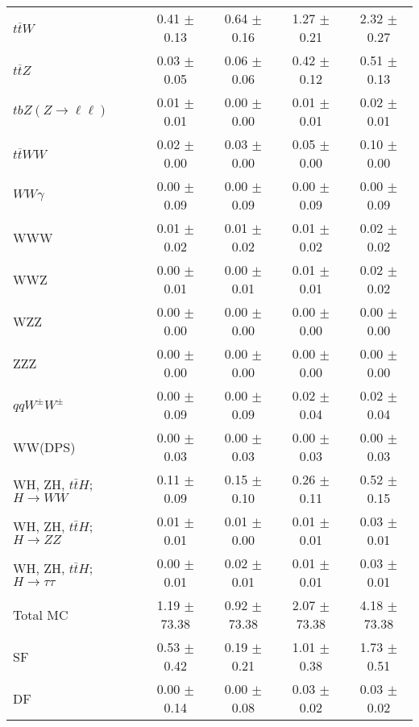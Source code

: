 \begin{tabular}{l|cccc}
                   $t\overline{t}W$ &  0.41 $\pm$  0.13 &  0.64 $\pm$  0.16 &  1.27 $\pm$  0.21 &  2.32 $\pm$  0.27 \\
                   $t\overline{t}Z$ &  0.03 $\pm$  0.05 &  0.06 $\pm$  0.06 &  0.42 $\pm$  0.12 &  0.51 $\pm$  0.13 \\
    $tbZ (Z \rightarrow \ell \ell)$ &  0.01 $\pm$  0.01 &  0.00 $\pm$  0.00 &  0.01 $\pm$  0.01 &  0.02 $\pm$  0.01 \\
                  $t\overline{t}WW$ &  0.02 $\pm$  0.00 &  0.03 $\pm$  0.00 &  0.05 $\pm$  0.00 &  0.10 $\pm$  0.00 \\
                         $WW\gamma$ &  0.00 $\pm$  0.09 &  0.00 $\pm$  0.09 &  0.00 $\pm$  0.09 &  0.00 $\pm$  0.09 \\
                                WWW &  0.01 $\pm$  0.02 &  0.01 $\pm$  0.02 &  0.01 $\pm$  0.02 &  0.02 $\pm$  0.02 \\
                                WWZ &  0.00 $\pm$  0.01 &  0.00 $\pm$  0.01 &  0.01 $\pm$  0.01 &  0.02 $\pm$  0.02 \\
                                WZZ &  0.00 $\pm$  0.00 &  0.00 $\pm$  0.00 &  0.00 $\pm$  0.00 &  0.00 $\pm$  0.00 \\
                                ZZZ &  0.00 $\pm$  0.00 &  0.00 $\pm$  0.00 &  0.00 $\pm$  0.00 &  0.00 $\pm$  0.00 \\
                 $qqW^{\pm}W^{\pm}$ &  0.00 $\pm$  0.09 &  0.00 $\pm$  0.09 &  0.02 $\pm$  0.04 &  0.02 $\pm$  0.04 \\
                            WW(DPS) &  0.00 $\pm$  0.03 &  0.00 $\pm$  0.03 &  0.00 $\pm$  0.03 &  0.00 $\pm$  0.03 \\
WH, ZH, $t\bar{t}H$; $H \rightarrow WW$ &  0.11 $\pm$  0.09 &  0.15 $\pm$  0.10 &  0.26 $\pm$  0.11 &  0.52 $\pm$  0.15 \\
WH, ZH, $t\bar{t}H$; $H \rightarrow ZZ$ &  0.01 $\pm$  0.01 &  0.01 $\pm$  0.00 &  0.01 $\pm$  0.01 &  0.03 $\pm$  0.01 \\
WH, ZH, $t\bar{t}H$; $H \rightarrow \tau\tau$ &  0.00 $\pm$  0.01 &  0.02 $\pm$  0.01 &  0.01 $\pm$  0.01 &  0.03 $\pm$  0.01 \\
\hline\hline
                           Total MC &  1.19 $\pm$ 73.38 &  0.92 $\pm$ 73.38 &  2.07 $\pm$ 73.38 &  4.18 $\pm$ 73.38 \\
\hline
                                 SF &  0.53 $\pm$  0.42 &  0.19 $\pm$  0.21 &  1.01 $\pm$  0.38 &  1.73 $\pm$  0.51 \\
                                 DF &  0.00 $\pm$  0.14 &  0.00 $\pm$  0.08 &  0.03 $\pm$  0.02 &  0.03 $\pm$  0.02 \\

\end{tabular}
